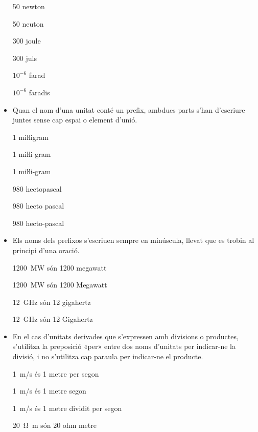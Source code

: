 \begin{itemize}
\textcolor{Green}\faCheckSquare{} 50 newton

\textcolor{Red}\faTimesCircle{}  50 neuton

\textcolor{Green}\faCheckSquare{} 300 joule

\textcolor{Red}\faTimesCircle{}  300 juls

\textcolor{Green}\faCheckSquare{} $10^{-6}$ farad

\textcolor{Red}\faTimesCircle{}  $10^{-6}$ faradis


 \item Quan el nom d'una unitat
conté un prefix, ambdues parts s'han d'escriure juntes sense cap espai o element d'unió.

\textcolor{Green}\faCheckSquare{} 1 miŀligram

\textcolor{Red}\faTimesCircle{} 1 miŀli gram

\textcolor{Red}\faTimesCircle{} 1 miŀli-gram

\textcolor{Green}\faCheckSquare{}  980 hectopascal

\textcolor{Red}\faTimesCircle{} 980 hecto pascal

\textcolor{Red}\faTimesCircle{} 980 hecto-pascal


\item Els noms dels prefixos s'escriuen sempre en minúscula, llevat que es trobin al principi d'una oració.

\textcolor{Green}\faCheckSquare{} \qty{1200}{MW} són 1200 megawatt

\textcolor{Red}\faTimesCircle{} \qty{1200}{MW} són 1200 Megawatt

\textcolor{Green}\faCheckSquare{} \qty{12}{GHz} són 12 gigahertz

\textcolor{Red}\faTimesCircle{} \qty{12}{GHz}  són 12 Gigahertz


\item En el cas  d'unitats derivades que s'expressen amb divisions o
productes, s'utilitza la preposició «per» entre dos noms d'unitats
per indicar-ne la divisió, i no s'utilitza cap paraula per indicar-ne el
producte.

\textcolor{Green}\faCheckSquare{} \qty{1}{m/s} és 1 metre per segon

\textcolor{Red}\faTimesCircle{}  \qty{1}{m/s} és 1 metre segon

\textcolor{Red}\faTimesCircle{}  \qty{1}{m/s} és 1 metre dividit per segon

 \textcolor{Green}\faCheckSquare{} \qty{20}{\ohm.m} són 20 ohm metre


\end{itemize}
